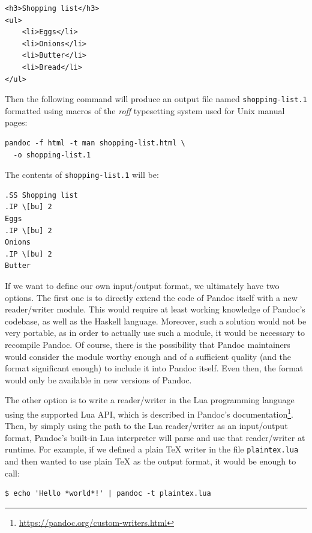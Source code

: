 \documentclass[
  digital,     %
  oneside,     %
  nosansbold,  %
  nocolorbold, %
  lof,         %
  nolot,       %
]{fithesis4}
\begin{document}
\noindent
\lstset{language=HTML}
\begin{lstlisting}
<h3>Shopping list</h3>
<ul>
    <li>Eggs</li>
    <li>Onions</li>
    <li>Butter</li>
    <li>Bread</li>
</ul>
\end{lstlisting}

\noindent
Then the following command will produce an output file named \texttt{shopping-list.1} formatted using macros of the \textit{roff} typesetting system used for Unix manual pages:

\noindent
\lstset{language=}
\begin{lstlisting}
pandoc -f html -t man shopping-list.html \
  -o shopping-list.1
\end{lstlisting}

\noindent
The contents of \texttt{shopping-list.1} will be:

\noindent
\begin{lstlisting}
.SS Shopping list
.IP \[bu] 2
Eggs
.IP \[bu] 2
Onions
.IP \[bu] 2
Butter
\end{lstlisting}

\noindent
If we want to define our own input/output format, we ultimately have two options. The first one is to directly extend the code of Pandoc itself with a new reader/writer module. This would require at least working knowledge of Pandoc's codebase, as well as the Haskell language. Moreover, such a solution would not be very portable, as in order to actually use such a module, it would be necessary to recompile Pandoc. Of course, there is the possibility that Pandoc maintainers would consider the module worthy enough and of a sufficient quality (and the format significant enough) to include it into Pandoc itself. Even then, the format would only be available in new versions of Pandoc.

The other option is to write a reader/writer in the Lua programming language using the supported Lua API, which is described in Pandoc's documentation\footnote{\url{https://pandoc.org/custom-writers.html}}. Then, by simply using the path to the Lua reader/writer as an input/output format, Pandoc's built-in Lua interpreter will parse and use that reader/writer at runtime. For example, if we defined a plain \TeX{} writer in the file \texttt{plaintex.lua} and then wanted to use plain \TeX{} as the output format, it would be enough to call:

\noindent
\begin{lstlisting}
$ echo 'Hello *world*!' | pandoc -t plaintex.lua
\end{lstlisting}
\end{document}
